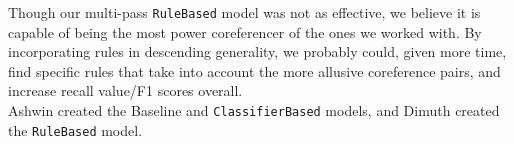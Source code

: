 \documentclass[12pt]{article}
\begin{document}
Though our multi-pass \texttt{RuleBased} model was not as effective, we believe it is capable of being the most power coreferencer of the ones we worked with. By incorporating rules in descending generality, we probably could, given more time, find specific rules that take into account the more allusive coreference pairs, and increase recall value/F1 scores overall. \\

Ashwin created the Baseline and \texttt{ClassifierBased} models, and Dimuth created the \texttt{RuleBased} model.
\end{document}
